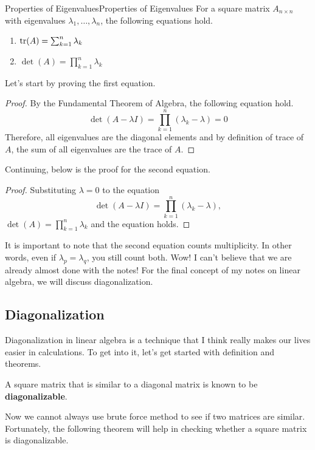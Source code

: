 \documentclass[../main.tex]{subfiles}
\begin{document}
\begin{theorem}{Properties of Eigenvalues}{Properties of Eigenvalues}
For a square matrix $A_{n \times n}$ with eigenvalues $\lambda_1,
\ldots, \lambda_n$, the following equations hold.
\begin{enumerate}[noitemsep]
\item $\operatorname{tr}(A) = \sum_{k=1}^n \lambda_k$
\item $\det(A) = \prod_{k=1}^n \lambda_k$
\end{enumerate}
\end{theorem}

Let's start by proving the first equation.

\begin{proof}
By the Fundamental Theorem of Algebra, the following equation hold.
\[
\det(A - \lambda I)
= \prod_{k=1}^n (\lambda_k - \lambda)
= 0
\]
Therefore, all eigenvalues are the diagonal elements and by
definition of trace of $A$, the sum of all eigenvalues are the
trace of $A$.
\end{proof}

Continuing, below is the proof for the second equation.

\begin{proof}
Substituting $\lambda = 0$ to the equation
\[
\det(A - \lambda I)
= \prod_{k=1}^n (\lambda_k - \lambda),
\]
$\det(A) = \prod_{k=1}^n \lambda_k$ and the equation holds.
\end{proof}

It is important to note that the second equation counts multiplicity.
In other words, even if $\lambda_p = \lambda_q$, you still count
both. Wow! I can't believe that we are already almost done with the
notes! For the final concept of my notes on linear algebra, we will
discuss diagonalization.

\subsection{Diagonalization}

Diagonalization in linear algebra is a technique that I think
really makes our lives easier in calculations. To get into it,
let's get started with definition and theorems.

\begin{definition}
A square matrix that is similar to a diagonal matrix is known to be
\textbf{diagonalizable}.
\end{definition}

Now we cannot always use brute force method to see if two matrices
are similar. Fortunately, the following theorem will help in checking
whether a square matrix is diagonalizable.
\end{document}
